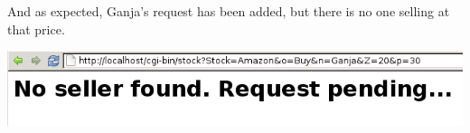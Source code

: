 And as expected, Ganja's request has been added, but there is no one selling at that price.

 
\includegraphics[scale=0.5]{../test5.png}
 